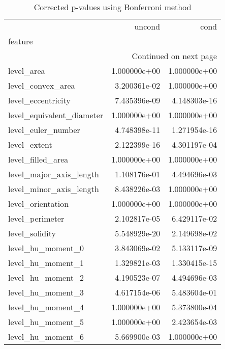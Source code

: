 \documentclass{report}
\begin{document}
\begin{longtable}{lrr}
	\caption[Corrected p-values]{ \small Corrected p-values using Bonferroni method}\\
	\toprule
	{} &         uncond &           cond \\
	feature                       &                &                \\
	\midrule
	\endhead
	\midrule
	\multicolumn{3}{r}{{Continued on next page}} \\
	\midrule
	\endfoot
	
	\bottomrule
	\endlastfoot
	level\_area                    &   1.000000e+00 &   1.000000e+00 \\
	level\_convex\_area             &   3.200361e-02 &   1.000000e+00 \\
	level\_eccentricity            &   7.435396e-09 &   4.148303e-16 \\
	level\_equivalent\_diameter     &   1.000000e+00 &   1.000000e+00 \\
	level\_euler\_number            &   4.748398e-11 &   1.271954e-16 \\
	level\_extent                  &   2.122399e-16 &   4.301197e-04 \\
	level\_filled\_area             &   1.000000e+00 &   1.000000e+00 \\
	level\_major\_axis\_length       &   1.108176e-01 &   4.494696e-03 \\
	level\_minor\_axis\_length       &   8.438226e-03 &   1.000000e+00 \\
	level\_orientation             &   1.000000e+00 &   1.000000e+00 \\
	level\_perimeter               &   2.102817e-05 &   6.429117e-02 \\
	level\_solidity                &   5.548929e-20 &   2.149698e-02 \\
	level\_hu\_moment\_0             &   3.843069e-02 &   5.133117e-09 \\
	level\_hu\_moment\_1             &   1.329821e-03 &   1.330415e-15 \\
	level\_hu\_moment\_2             &   4.190523e-07 &   4.494696e-03 \\
	level\_hu\_moment\_3             &   4.617154e-06 &   5.483604e-01 \\
	level\_hu\_moment\_4             &   1.000000e+00 &   5.373800e-04 \\
	level\_hu\_moment\_5             &   1.000000e+00 &   2.423654e-03 \\
	level\_hu\_moment\_6             &   5.669900e-03 &   1.000000e+00 \\

\end{longtable}
\end{document}
